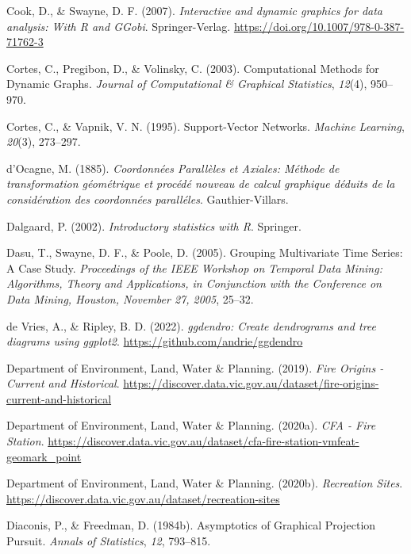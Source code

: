 \documentclass[
  letterpaper,
]{krantz}
\newlength{\cslhangindent}
\newenvironment{CSLReferences}[2] %
 {\begin{list}{}{%
  \setlength{\itemindent}{0pt}
  \setlength{\leftmargin}{0pt}
  \setlength{\parsep}{0pt}
  \ifodd #1
   \setlength{\leftmargin}{\cslhangindent}
   \setlength{\itemindent}{-1\cslhangindent}
  \fi
  \setlength{\itemsep}{#2\baselineskip}}}
 {\end{list}}
\begin{document}
\begin{CSLReferences}{1}{0}
Cook, D., \& Swayne, D. F. (2007). \emph{Interactive and dynamic
graphics for data analysis: With {R} and {GGobi}}. Springer-Verlag.
\url{https://doi.org/10.1007/978-0-387-71762-3}

Cortes, C., Pregibon, D., \& Volinsky, C. (2003). Computational
{M}ethods for {D}ynamic {G}raphs. \emph{Journal of Computational \&
Graphical Statistics}, \emph{12}(4), 950--970.

Cortes, C., \& Vapnik, V. N. (1995). Support-{V}ector {N}etworks.
\emph{Machine Learning}, \emph{20}(3), 273--297.

d'Ocagne, M. (1885). \emph{{C}oordonnées {P}arallèles et {A}xiales:
{M}éthode de transformation géométrique et procédé nouveau de calcul
graphique déduits de la considération des coordonnées paralléles}.
Gauthier-Villars.

Dalgaard, P. (2002). \emph{Introductory statistics with {R}}. Springer.

Dasu, T., Swayne, D. F., \& Poole, D. (2005). Grouping {M}ultivariate
{T}ime {S}eries: A {C}ase {S}tudy. \emph{Proceedings of the IEEE
Workshop on {T}emporal {D}ata {M}ining: {A}lgorithms, {T}heory and
{A}pplications, in Conjunction with the Conference on Data Mining,
Houston, November 27, 2005}, 25--32.

de Vries, A., \& Ripley, B. D. (2022). \emph{{ggdendro}: Create
dendrograms and tree diagrams using ggplot2}.
\url{https://github.com/andrie/ggdendro}

Department of Environment, Land, Water \& Planning. (2019). \emph{{Fire
Origins - Current and Historical}}.
\url{https://discover.data.vic.gov.au/dataset/fire-origins-current-and-historical}

Department of Environment, Land, Water \& Planning. (2020a). \emph{{CFA
- Fire Station}}.
\url{https://discover.data.vic.gov.au/dataset/cfa-fire-station-vmfeat-geomark_point}

Department of Environment, Land, Water \& Planning. (2020b).
\emph{{Recreation Sites}}.
\url{https://discover.data.vic.gov.au/dataset/recreation-sites}

Diaconis, P., \& Freedman, D. (1984b). {A}symptotics of {G}raphical
{P}rojection {P}ursuit. \emph{Annals of Statistics}, \emph{12},
793--815.


\end{CSLReferences}
\end{document}
